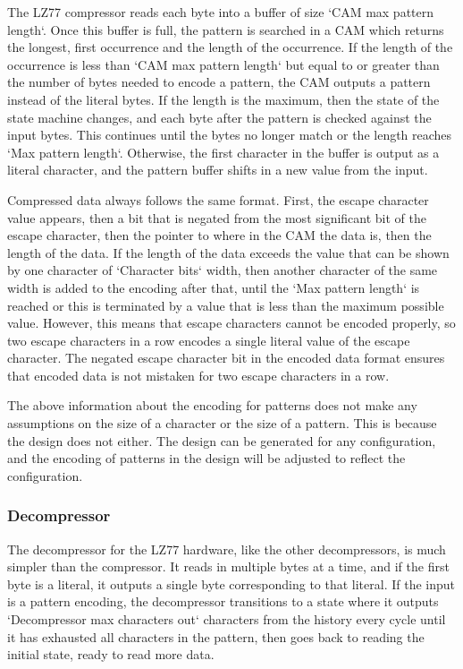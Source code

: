 \documentclass[doublespace,nopageskip]{VTthesis}
\begin{document}
The LZ77 compressor reads each byte into a buffer of size `CAM max pattern length`. Once this buffer is full, the pattern is searched in a CAM which returns the longest, first occurrence and the length of the occurrence. If the length of the occurrence is less than `CAM max pattern length` but equal to or greater than the number of bytes needed to encode a pattern, the CAM outputs a pattern instead of the literal bytes. If the length is the maximum, then the state of the state machine changes, and each byte after the pattern is checked against the input bytes. This continues until the bytes no longer match or the length reaches `Max pattern length`. Otherwise, the first character in the buffer is output as a literal character, and the pattern buffer shifts in a new value from the input.

Compressed data always follows the same format. First, the escape character value appears, then a bit that is negated from the most significant bit of the escape character, then the pointer to where in the CAM the data is, then the length of the data. If the length of the data exceeds the value that can be shown by one character of `Character bits` width, then another character of the same width is added to the encoding after that, until the `Max pattern length` is reached or this is terminated by a value that is less than the maximum possible value. However, this means that escape characters cannot be encoded properly, so two escape characters in a row encodes a single literal value of the escape character. The negated escape character bit in the encoded data format ensures that encoded data is not mistaken for two escape characters in a row.

The above information about the encoding for patterns does not make any assumptions on the size of a character or the size of a pattern. This is because the design does not either. The design can be generated for any configuration, and the encoding of patterns in the design will be adjusted to reflect the configuration.

\subsubsection{Decompressor}\label{sss:lz77_decompressor_design}
The decompressor for the LZ77 hardware, like the other decompressors, is much simpler than the compressor. It reads in multiple bytes at a time, and if the first byte is a literal, it outputs a single byte corresponding to that literal. If the input is a pattern encoding, the decompressor transitions to a state where it outputs `Decompressor max characters out` characters from the history every cycle until it has exhausted all characters in the pattern, then goes back to reading the initial state, ready to read more data.
\end{document}
